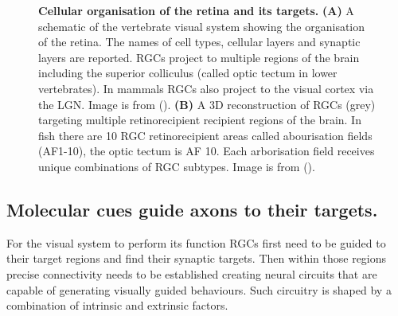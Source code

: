 \begin{figure}[!ht]
            \caption[\textbf{\label{fig:i_ret}\textbf{Cellular organisation of the retina and its targets.}}]{ \textbf{\label{fig:i_ret} Cellular organisation of the retina and its targets.} \textbf{(A)}  A schematic of the vertebrate visual system showing the organisation of the retina. The names of cell types, cellular layers and synaptic layers are reported. RGCs project to multiple regions of the brain including the superior colliculus (called optic tectum in lower vertebrates). In mammals RGCs also project to the visual cortex via the LGN. Image is from (\cite{Sanes2010DesignSystems}). \textbf{(B)} A 3D reconstruction of RGCs (grey) targeting multiple retinorecipient recipient regions of the brain. In fish there are 10 RGC retinorecipient areas called abourisation fields (AF1-10), the optic tectum is AF 10. Each arborisation field receives unique combinations of RGC subtypes. Image is from (\cite{Robles2014}).}
      \end{figure}

\subsection{Molecular cues guide axons to their targets.}
For the visual system to perform its function RGCs first need to be guided to their target regions and find their synaptic targets. Then within those regions precise connectivity needs to be established creating neural circuits that are capable of generating visually guided behaviours. Such circuitry is shaped by a combination of intrinsic and extrinsic factors.

